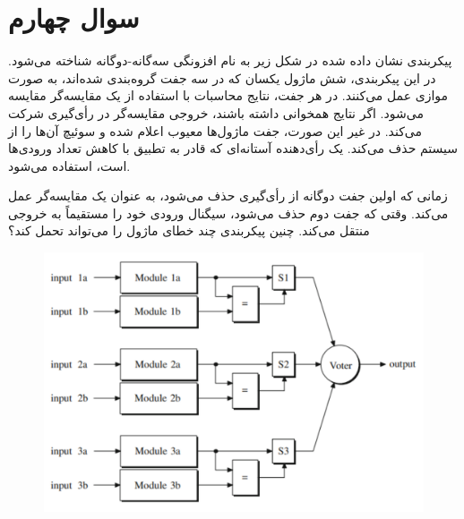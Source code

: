 \section{سوال چهارم}


پیکربندی نشان داده شده در شکل زیر به نام افزونگی سه‌گانه‌-دوگانه  شناخته می‌شود. در این پیکربندی، شش ماژول یکسان که در سه جفت گروه‌بندی شده‌اند، به صورت موازی عمل می‌کنند. در هر جفت، نتایج محاسبات با استفاده از یک مقایسه‌گر مقایسه می‌شود. اگر نتایج همخوانی داشته باشند، خروجی مقایسه‌گر در رأی‌گیری شرکت می‌کند. در غیر این صورت، جفت ماژول‌ها معیوب اعلام شده و سوئیچ آن‌ها را از سیستم حذف می‌کند. یک رأی‌دهنده آستانه‌ای که قادر به تطبیق با کاهش تعداد ورودی‌ها است، استفاده می‌شود.

زمانی که اولین جفت دوگانه از رأی‌گیری حذف می‌شود، به عنوان یک مقایسه‌گر عمل می‌کند. وقتی که جفت دوم حذف می‌شود، سیگنال ورودی خود را مستقیماً به خروجی منتقل می‌کند. چنین پیکربندی چند خطای ماژول را می‌تواند تحمل کند؟

\begin{figure}[h]
	\centering
	\includegraphics*[width=0.6\linewidth]{pics/img2.png}
\end{figure}




